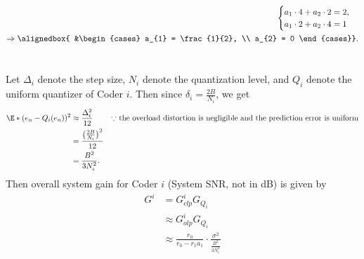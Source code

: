 \documentclass[
  coursecode={MTHE 477},
  assignmentname={Homework \homeworknumber},
  studentnumber=20053722,
  name={Bryan Hoang},
  draft,
]{
  ltxanswer%
}
\begin{document}
\begin{questions}
\begin{parts}
\begin{solution}
\begin{align*}
\begin{cases}
                                      a_{1} \cdot 4 + a_{2} \cdot 2 = 2, \\
                                      a_{1} \cdot 2 + a_{2} \cdot 4 = 1
                                    \end{cases} \\
          \Rightarrow \alignedbox{ &\begin{cases}
                                        a_{1} = \frac{1}{2}, \\
                                        a_{2} = 0
                                      \end{cases}}.
        \end{align*}
      \end{solution}

      \part{}
      \begin{solution}
        Let \(\Delta_{i}\) denote the step size, \(N_{i}\) denote the quantization level, and \(Q_{i}\) denote the uniform quantizer of Coder \(i\). Then since \(\delta_{i} = \frac{2B}{N_{i}}\), we get
        \begin{align*}
          \E*{(e_{n} - Q_{i}(e_{n}))^{2}} &\approx \frac{\Delta_{i}^{2}}{12}              & &\text{\(\because\) the overload distortion is negligible and the prediction error is uniform} \\
                                          &= \frac{\bigl(\frac{2 B}{N_{i}}\bigr)^{2}}{12}                                                                                                  \\
                                          &= \frac{B^{2}}{3 N_{i}^{2}}.                                                                                                                    \\
        \end{align*}
        Then overall system gain for Coder \(i\) (System SNR, not in dB) is given by
        \begin{align*}
          G^{i} &= G_{clp}^{i} G_{Q_{i}}                                                                      \\
                &\approx G_{olp}^{i} G_{Q_{i}}                                                                \\
                &\approx \frac{r_{0}}{r_{0} - r_{1} a_{1}} \cdot \frac{\sigma^{2}}{\frac{B^{2}}{3 N_{i}^{2}}} \\

\end{align*}
\end{solution}
\end{parts}
\end{questions}
\end{document}
